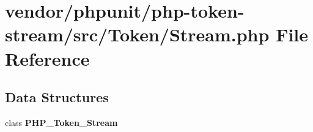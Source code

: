 \section{vendor/phpunit/php-\/token-\/stream/src/\+Token/\+Stream.php File Reference}
\label{_stream_8php}
\subsection*{Data Structures}
\begin{DoxyCompactItemize}
\item 
class {\bf P\+H\+P\+\_\+\+Token\+\_\+\+Stream}
\end{DoxyCompactItemize}
